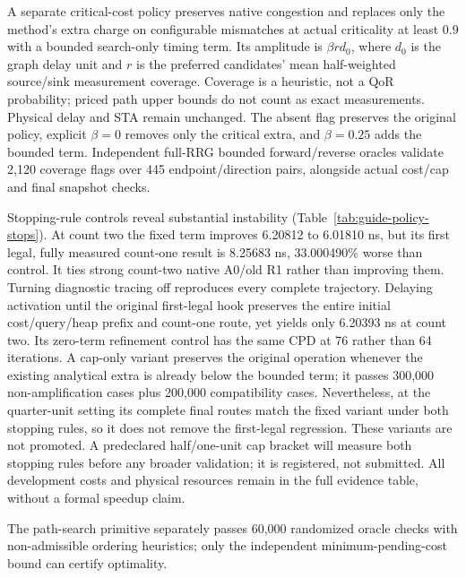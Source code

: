 \documentclass[conference,10pt]{IEEEtran}
\begin{document}
A separate critical-cost policy preserves native congestion and replaces only the method's extra charge on configurable mismatches at actual criticality at least 0.9 with a bounded search-only timing term. Its amplitude is $\beta r d_0$, where $d_0$ is the graph delay unit and $r$ is the preferred candidates' mean half-weighted source/sink measurement coverage. Coverage is a heuristic, not a QoR probability; priced path upper bounds do not count as exact measurements. Physical delay and STA remain unchanged. The absent flag preserves the original policy, explicit $\beta=0$ removes only the critical extra, and $\beta=0.25$ adds the bounded term. Independent full-RRG bounded forward/reverse oracles validate 2,120 coverage flags over 445 endpoint/direction pairs, alongside actual cost/cap and final snapshot checks.

Stopping-rule controls reveal substantial instability (Table~\ref{tab:guide-policy-stops}). At count two the fixed term improves 6.20812 to 6.01810 ns, but its first legal, fully measured count-one result is 8.25683 ns, 33.000490\% worse than control. It ties strong count-two native A0/old R1 rather than improving them. Turning diagnostic tracing off reproduces every complete trajectory. Delaying activation until the original first-legal hook preserves the entire initial cost/query/heap prefix and count-one route, yet yields only 6.20393 ns at count two. Its zero-term refinement control has the same CPD at 76 rather than 64 iterations. A cap-only variant preserves the original operation whenever the existing analytical extra is already below the bounded term; it passes 300,000 non-amplification cases plus 200,000 compatibility cases. Nevertheless, at the quarter-unit setting its complete final routes match the fixed variant under both stopping rules, so it does not remove the first-legal regression. These variants are not promoted. A predeclared half/one-unit cap bracket will measure both stopping rules before any broader validation; it is registered, not submitted. All development costs and physical resources remain in the full evidence table, without a formal speedup claim.














 The path-search primitive separately passes 60,000 randomized oracle checks with non-admissible ordering heuristics; only the independent minimum-pending-cost bound can certify optimality.
\end{document}

